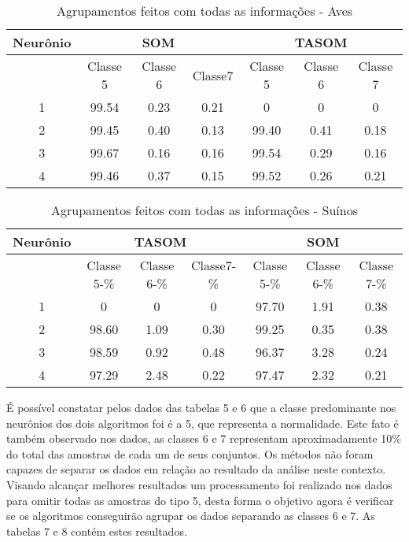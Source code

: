 \begin{table}[h]
\centering
\caption{Agrupamentos feitos com todas as informações - Aves}
\label{my-label}
\begin{tabular}{|c|c|c|c|c|c|c|}
\hline
Neurônio & \multicolumn{3}{c|}{SOM}      & \multicolumn{3}{c|}{TASOM}     \\ \hline
         & Classe 5 & Classe 6 & Classe7 & Classe 5 & Classe 6 & Classe 7 \\ \hline
1        & 99.54    & 0.23     & 0.21    & 0        & 0        & 0        \\ \hline
2        & 99.45        & 0.40        & 0.13       & 99.40    & 0.41     & 0.18     \\ \hline
3        & 99.67       & 0.16        & 0.16       & 99.54    & 0.29     & 0.16     \\ \hline
4        & 99.46    & 0.37     & 0.15    & 99.52    & 0.26     & 0.21     \\ \hline
\end{tabular}
\end{table}

\begin{table}[h]
\centering
\caption{Agrupamentos feitos com todas as informações - Suínos}
\label{my-label}
\begin{tabular}{|c|c|c|c|c|c|c|}
\hline
Neurônio & \multicolumn{3}{c|}{TASOM}      & \multicolumn{3}{c|}{SOM}     \\ \hline
         & Classe 5-\% & Classe 6-\% & Classe7-\% & Classe 5-\% & Classe 6-\% & Classe 7-\% \\ \hline
1        & 0        & 0        & 0       & 97.70    & 1.91     & 0.38     \\ \hline
2        & 98.60    & 1.09     & 0.30    & 99.25        & 0.35        & 0.38        \\ \hline
3        & 98.59    & 0.92     & 0.48    & 96.37        & 3.28        & 0.24        \\ \hline
4        & 97.29    & 2.48     & 0.22    & 97.47    & 2.32     & 0.21     \\ \hline
\end{tabular}
\end{table}

É possível constatar pelos dados das tabelas 5 e 6 que a classe predominante nos neurônios dos dois algoritmos foi é a 5, que representa a normalidade. Este fato é também observado nos dados, as classes 6 e 7 representam aproximadamente 10\% do total das amostras de cada um de seus conjuntos. Os métodos não foram capazes de separar os dados em relação ao resultado da análise neste contexto. Visando alcançar melhores resultados um processamento foi realizado nos dados para omitir todas as amostras do tipo 5, desta forma o objetivo agora é verificar se os algoritmos conseguirão agrupar os dados separando as classes 6 e 7. As tabelas 7 e 8 contém estes resultados.

